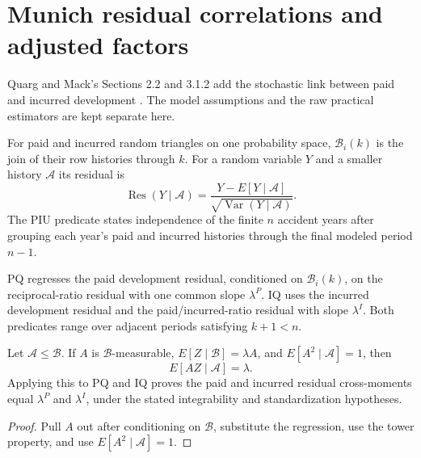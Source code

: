 \chapter{Munich residual correlations and adjusted factors}

Quarg and Mack's Sections 2.2 and 3.1.2 add the stochastic link between paid
and incurred development \cite{QuargMack2004}.  The model assumptions and the
raw practical estimators are kept separate here.

\begin{definition}\label{def:munichResidual}\leanok
For paid and incurred random triangles on one probability space,
$\mathcal B_i(k)$ is the join of their row histories through $k$.  For a random
variable $Y$ and a smaller history $\mathcal A$ its residual is
\[
 \operatorname{Res}(Y\mid\mathcal A)
 =\frac{Y-E[Y\mid\mathcal A]}{\sqrt{\operatorname{Var}(Y\mid\mathcal A)}}.
\]
The PIU predicate states independence of the finite $n$ accident years after
grouping each year's paid and incurred histories through the final modeled
period $n-1$.
\end{definition}

\begin{definition}[PQ and IQ]\label{def:munichRegression}\leanok
{}
PQ regresses the paid development residual, conditioned on $\mathcal B_i(k)$,
on the reciprocal-ratio residual with one common slope $\lambda^P$.  IQ uses
the incurred development residual and the paid/incurred-ratio residual with
slope $\lambda^I$.  Both predicates range over adjacent periods satisfying
$k+1<n$.
\end{definition}

\begin{theorem}\label{thm:munichCorrelation}\leanok
{}
Let $\mathcal A\le\mathcal B$.  If $A$ is $\mathcal B$-measurable,
$E[Z\mid\mathcal B]=\lambda A$, and $E[A^2\mid\mathcal A]=1$, then
\[
  E[AZ\mid\mathcal A]=\lambda.
\]
Applying this to PQ and IQ proves the paid and incurred residual
cross-moments equal $\lambda^P$ and $\lambda^I$, under the stated
integrability and standardization hypotheses.
\end{theorem}
\begin{proof}\leanok Pull $A$ out after conditioning on $\mathcal B$, substitute the regression, use the tower property, and use $E[A^2\mid\mathcal A]=1$. \end{proof}

